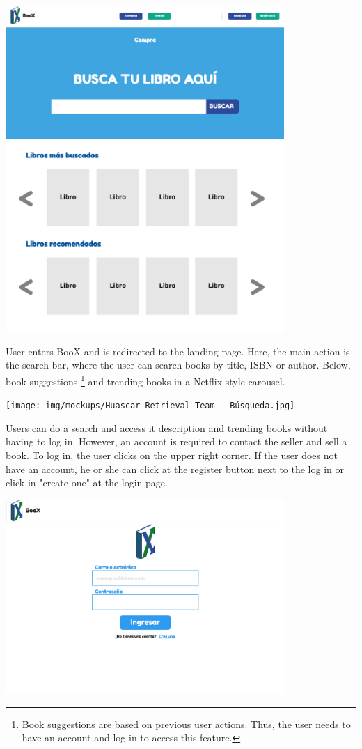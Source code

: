 \begin{center}
    \includegraphics[width=300pt]{img/mockups/Huascar Retrieval Team - Landing.jpg}
\end{center}

User enters BooX and is redirected to the landing page. Here, the main action is the search bar, where the user can search books by title, ISBN or author. Below, book suggestions \footnote{Book suggestions are based on previous user actions. Thus, the user needs to have an account and log in to access this feature.} and trending books in a Netflix-style carousel.\\
\begin{center}
    \texttt{[image: img/mockups/Huascar Retrieval Team - Búsqueda.jpg]}
\end{center}

Users can do a search and access it description and trending books without having to log in. However, an account is required to contact the seller and sell a book. To log in, the user clicks on the upper right corner. If the user does not have an account, he or she can click at the register button next to the log in or click in "create one" at the login page.\\
\begin{center}
    \includegraphics[width=300pt]{img/mockups/Huascar Retrieval Team - Login.jpg}
    \end{center}
